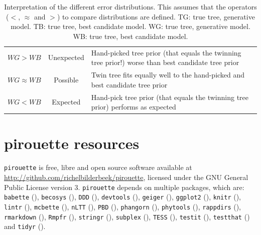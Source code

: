 \begin{table}
\begin{tabular}{ | r | c | p{9cm} | }
    \hline
    \textbf{$WG > WB$}       & Unexpected & Hand-picked tree prior (that equals 
      the twinning tree prior!) worse than best candidate tree prior \\
    \textbf{$WG \approx WB$} & Possible   & Twin tree fits equally well to the 
      hand-picked and best candidate tree prior  \\
    \textbf{$WG < WB$}       & Expected   & Hand-pick tree prior (that equals 
      the twinning tree prior) performs as expected \\
    \hline
  \end{tabular}
  \caption{
    Interpretation of the different error distributions.
    This assumes that the operators ($<$, $\approx$ and $>$) to compare
    distributions are defined.
    TG: true tree, generative model.
    TB: true tree, best candidate model.
    WG: true tree, generative model.
    WB: true tree, best candidate model.
  }
  \label{tab:interpretation}
\end{table}

\section{pirouette resources}

\verb;pirouette; is free, libre and open source software available at 
\url{http://github.com/richelbilderbeek/pirouette},
licensed under the GNU General Public License version 3.
\verb;pirouette; depends on multiple packages, which are:
\verb;babette; (\cite{bilderbeek2018babette}),
\verb;becosys; (\cite{becosys}),
\verb;DDD; (\cite{DDD}),
\verb;devtools; (\cite{devtools}),
\verb;geiger; (\cite{geiger}),
\verb;ggplot2; (\cite{ggplot2}),
\verb;knitr; (\cite{knitr}),
\verb;lintr; (\cite{lintr}),
\verb;mcbette; (\cite{mcbette}),
\verb;nLTT; (\cite{nLTT}),
\verb;PBD; (\cite{PBD}),
\verb;phangorn; (\cite{phangorn}),
\verb;phytools; (\cite{phytools}),
\verb;rappdirs; (\cite{rappdirs}),
\verb;rmarkdown; (\cite{rmarkdown}),
\verb;Rmpfr; (\cite{Rmpfr}),
\verb;stringr; (\cite{stringr}),
\verb;subplex; (\cite{subplex}),
\verb;TESS; (\cite{TESS}),
\verb;testit; (\cite{testit}), 
\verb;testthat; (\cite{testthat}) and
\verb;tidyr; (\cite{tidyr}).

